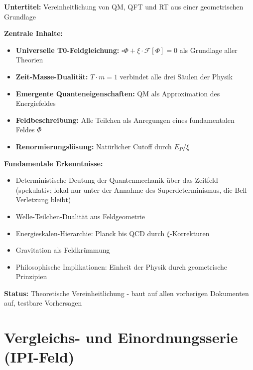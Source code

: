 	\begin{documentbox}
		\textbf{Untertitel:} Vereinheitlichung von QM, QFT und RT aus einer geometrischen Grundlage
		
		\textbf{Zentrale Inhalte:}
		\begin{itemize}
			\item \textbf{Universelle T0-Feldgleichung:} $\square \Phi + \xi \cdot \mathcal{F}[\Phi] = 0$ als Grundlage aller Theorien
			\item \textbf{Zeit-Masse-Dualität:} $T \cdot m = 1$ verbindet alle drei Säulen der Physik
			\item \textbf{Emergente Quanteneigenschaften:} QM als Approximation des Energiefeldes
			\item \textbf{Feldbeschreibung:} Alle Teilchen als Anregungen eines fundamentalen Feldes $\Phi$
			\item \textbf{Renormierungslösung:} Natürlicher Cutoff durch $E_P/\xi$
					\end{itemize}
		
		\textbf{Fundamentale Erkenntnisse:}
		\begin{itemize}
			\item Deterministische Deutung der Quantenmechanik über das Zeitfeld (spekulativ; lokal nur unter der Annahme des Superdeterminismus, die Bell-Verletzung bleibt)
			\item Welle-Teilchen-Dualität aus Feldgeometrie
			\item Energieskalen-Hierarchie: Planck bis QCD durch $\xi$-Korrekturen
			\item Gravitation als Feldkrümmung
			\item Philosophische Implikationen: Einheit der Physik durch geometrische Prinzipien
		\end{itemize}
		
		\textbf{Status:} Theoretische Vereinheitlichung - baut auf allen vorherigen Dokumenten auf, testbare Vorhersagen
	\end{documentbox}

	\section{Vergleichs- und Einordnungsserie (IPI-Feld)}

